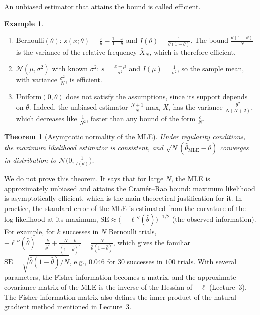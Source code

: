 \documentclass[11pt]{article}
\theoremstyle{definition}
\newtheorem{example}[definition]{Example}
\theoremstyle{plain}
\newtheorem{theorem}[definition]{Theorem}
\theoremstyle{remark}
\begin{document}
An unbiased estimator that attains the bound is called efficient.

\begin{example}\label{ex:fisher}
    \begin{enumerate}
        \item Bernoulli$(\theta)$: $s(x; \theta) = \frac{x}{\theta} - \frac{1 - x}{1 - \theta}$ and $I(\theta) = \frac{1}{\theta(1 - \theta)}$. The bound $\frac{\theta(1 - \theta)}{N}$ is the variance of the relative frequency $\bar X_N$, which is therefore efficient.
        \item $\mathcal{N}(\mu, \sigma^2)$ with known $\sigma^2$: $s = \frac{x - \mu}{\sigma^2}$ and $I(\mu) = \frac{1}{\sigma^2}$, so the sample mean, with variance $\frac{\sigma^2}{N}$, is efficient.
        \item Uniform$(0, \theta)$ does not satisfy the assumptions, since its support depends on $\theta$. Indeed, the unbiased estimator $\frac{N + 1}{N}\max_i X_i$ has the variance $\frac{\theta^2}{N(N + 2)}$, which decreases like $\frac{1}{N^2}$, faster than any bound of the form $\frac{c}{N}$.
    \end{enumerate}
\end{example}

\begin{theorem}[Asymptotic normality of the MLE]\label{thm:mle-asymptotic}
    Under regularity conditions, the maximum likelihood estimator is consistent, and $\sqrt{N}(\hat\theta_{\text{MLE}} - \theta)$ converges in distribution to $\mathcal{N}\big(0, \frac{1}{I(\theta)}\big)$.
\end{theorem}

We do not prove this theorem. It says that for large $N$, the MLE is approximately unbiased and attains the Cram\'er--Rao bound: maximum likelihood is asymptotically efficient, which is the main theoretical justification for it. In practice, the standard error of the MLE is estimated from the curvature of the log-likelihood at its maximum, $\mathrm{SE} \approx \big(-\ell''(\hat\theta)\big)^{-1/2}$ (the observed information). For example, for $k$ successes in $N$ Bernoulli trials, $-\ell''(\hat\theta) = \frac{k}{\hat\theta^2} + \frac{N - k}{(1 - \hat\theta)^2} = \frac{N}{\hat\theta(1 - \hat\theta)}$, which gives the familiar $\mathrm{SE} = \sqrt{\hat\theta(1 - \hat\theta)/N}$, e.g., $0.046$ for $30$ successes in $100$ trials. With several parameters, the Fisher information becomes a matrix, and the approximate covariance matrix of the MLE is the inverse of the Hessian of $-\ell$ (Lecture~3). The Fisher information matrix also defines the inner product of the natural gradient method mentioned in Lecture~3.
\end{document}
